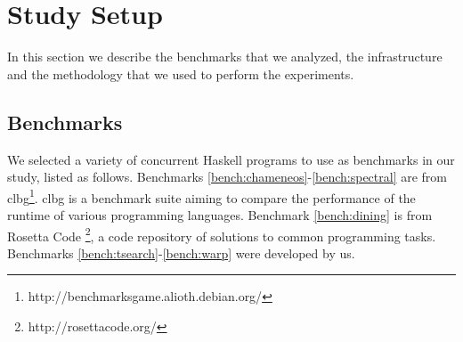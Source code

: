 \section{Study Setup}\label{sec:setup}
In this section we describe the benchmarks that we analyzed, the infrastructure and the methodology that we used to perform the experiments.

\subsection{Benchmarks}
We selected a variety of concurrent Haskell programs to use as benchmarks in our study, listed as follows. Benchmarks \ref{bench:chameneos}-\ref{bench:spectral} are from \ac{clbg}\footnote{http://benchmarksgame.alioth.debian.org/}. \acs{clbg} is a benchmark suite aiming to compare the performance of the runtime of various programming languages. Benchmark \ref{bench:dining} is from  Rosetta Code \footnote{http://rosettacode.org/}, a code repository of solutions to common programming tasks. Benchmarks \ref{bench:tsearch}-\ref{bench:warp} were developed by us.

